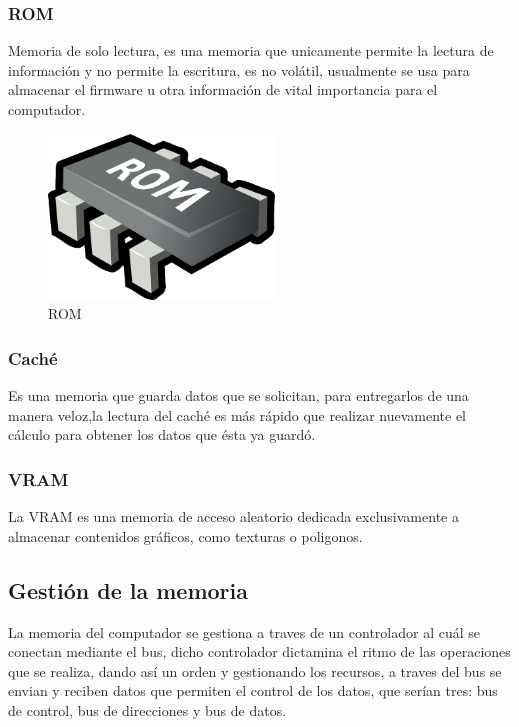 \documentclass{article}
\begin{document}
\subsubsection{ROM}
Memoria de solo lectura, es una memoria que unicamente permite la lectura de información y no permite la escritura, es no volátil, usualmente se usa para almacenar el firmware u otra información de vital importancia para el computador.
\begin{figure}[h]
\includegraphics[width=6cm]{ROM.png}
\centering
\caption{ROM}
\label{fig:ROM}
\end{figure}
\subsubsection{Caché}
Es una memoria que guarda datos que se solicitan, para entregarlos de una manera veloz,la lectura del caché es más rápido que realizar nuevamente el cálculo para obtener los datos que ésta ya guardó.
\subsubsection{VRAM}
La VRAM es una memoria de acceso aleatorio dedicada exclusivamente a almacenar contenidos gráficos, como texturas o poligonos.

\subsection{Gestión de la memoria}
La memoria del computador se gestiona a traves de un controlador al cuál se conectan mediante el bus, dicho controlador dictamina el ritmo de las operaciones que se realiza, dando así un orden y gestionando los recursos, a traves del bus se envian y reciben datos que permiten el control de los datos, que serían tres: bus de control, bus de direcciones y bus de datos.
\end{document}

